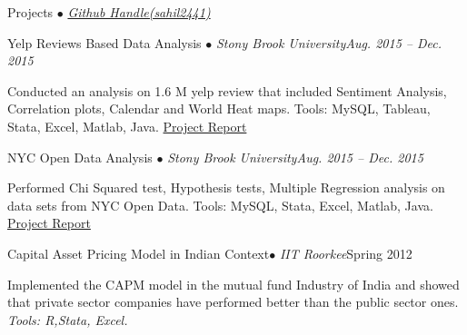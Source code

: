 \documentclass{resume} %
\begin{document}
\begin{rSection}{Projects {$\bullet$} \emph{\href{http://www.github.com/sahil2441}{\footnotesize Github Handle(sahil2441)}}}
\begin{rSubsection}{Yelp Reviews Based Data Analysis {\tiny$\bullet$} \emph{Stony Brook University}}{\emph{Aug. 2015 -- Dec. 2015}}{}{}
\item Conducted an analysis on 1.6 M yelp review that included Sentiment Analysis, Correlation plots, Calendar
      and World Heat maps.  Tools: MySQL, Tableau, Stata, Excel, Matlab, Java. 
\href{https://drive.google.com/file/d/0BzgUxxyAUxkycTZsY0pUUXY0NmM/view?usp=sharing}{Project Report}
\end{rSubsection}


\begin{rSubsection}{NYC Open Data Analysis {\tiny$\bullet$} \emph{Stony Brook University}}{\emph{Aug. 2015 -- Dec. 2015} }{}{}
\item Performed Chi Squared test, Hypothesis tests, Multiple Regression analysis on data sets from NYC Open
      Data. Tools: MySQL, Stata, Excel, Matlab, Java.
     \href{https://drive.google.com/file/d/0BzgUxxyAUxkyZTRlVE9xZVR6NDg/view?usp=sharing}{Project Report}
\end{rSubsection}


\begin{rSubsection}{Capital Asset Pricing Model in Indian Context{\tiny$\bullet$} \emph{IIT Roorkee}}{Spring 2012}{}{}
\item Implemented the CAPM model in the mutual fund Industry of India and showed that private sector companies have performed better than the
public sector ones. \emph{Tools: R,Stata, Excel.} 
\end{rSubsection}

\end{rSection}





\end{document}
